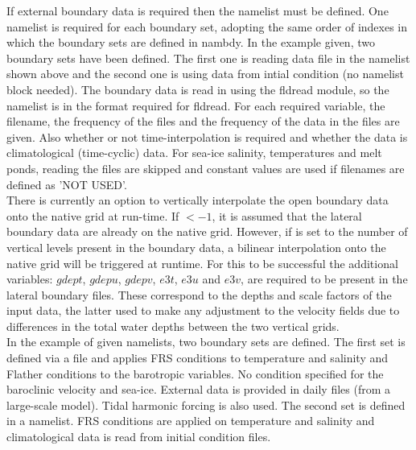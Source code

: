 \documentclass[../main/NEMO_manual]{subfiles}
\begin{document}
If external boundary data is required then the  namelist must be defined.
One  namelist is required for each boundary set, adopting the same order of indexes in which the boundary sets are defined in nambdy.
In the example given, two boundary sets have been defined. The first one is reading data file in the  namelist shown above
and the second one is using data from intial condition (no namelist block needed).
The boundary data is read in using the fldread module,
so the  namelist is in the format required for fldread.
For each required variable, the filename, the frequency of the files and
the frequency of the data in the files are given.
Also whether or not time-interpolation is required and whether the data is climatological (time-cyclic) data.
For sea-ice salinity, temperatures and melt ponds, reading the files are skipped and constant values are used if filenames are defined as {'NOT USED'}.\\

There is currently an option to vertically interpolate the open boundary data onto the native grid at run-time.
If $<-1$, it is assumed that the lateral boundary data are already on the native grid.
However, if  is set to the number of vertical levels present in the boundary data,
a bilinear interpolation onto the native grid will be triggered at runtime.
For this to be successful the additional variables: $gdept$, $gdepu$, $gdepv$, $e3t$, $e3u$ and $e3v$, are required to be present in the lateral boundary files.
These correspond to the depths and scale factors of the input data,
the latter used to make any adjustment to the velocity fields due to differences in the total water depths between the two vertical grids.\\

In the example of given namelists, two boundary sets are defined.
The first set is defined via a file and applies FRS conditions to temperature and salinity and
Flather conditions to the barotropic variables. No condition specified for the baroclinic velocity and sea-ice.
External data is provided in daily files (from a large-scale model).
Tidal harmonic forcing is also used.
The second set is defined in a namelist.
FRS conditions are applied on temperature and salinity and climatological data is read from initial condition files.

\end{document}
